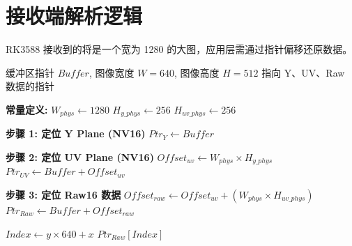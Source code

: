 \documentclass[UTF8]{ctexart}
\begin{document}

\section{接收端解析逻辑}

RK3588 接收到的将是一个宽为 1280 的大图，应用层需通过指针偏移还原数据。

\begin{algorithm}[H]
    \caption{Mode A (NV16) 数据解析逻辑}
    \begin{algorithmic}[1]
        \Require 缓冲区指针 $Buffer$, 图像宽度 $W=640$, 图像高度 $H=512$
        \Ensure 指向 Y、UV、Raw 数据的指针
        
        \State \textbf{常量定义:}
        \State \quad $W_{phys} \gets 1280$ 
        \State \quad $H_{y\_phys} \gets 256$ 
        \State \quad $H_{uv\_phys} \gets 256$ 
        
        \Statex
        \State \textbf{步骤 1: 定位 Y Plane (NV16)}
        \State $Ptr_{Y} \gets Buffer$
        \State {}
        
        \Statex
        \State \textbf{步骤 2: 定位 UV Plane (NV16)}
        \State $Offset_{uv} \gets W_{phys} \times H_{y\_phys}$
        \State $Ptr_{UV} \gets Buffer + Offset_{uv}$
        
        \Statex
        \State \textbf{步骤 3: 定位 Raw16 数据}
        \State $Offset_{raw} \gets Offset_{uv} + (W_{phys} \times H_{uv\_phys})$
        \State $Ptr_{Raw} \gets Buffer + Offset_{raw}$
        
        \Statex
            \State $Index \gets y \times 640 + x$
            \State \Return $Ptr_{Raw}[Index]$
        \EndFunction
    \end{algorithmic}
\end{algorithm}
\end{document}

